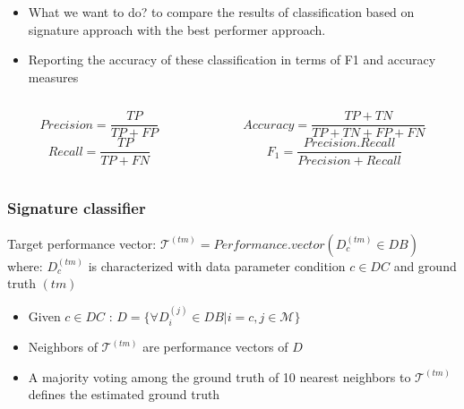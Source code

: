 \documentclass{beamer}
\begin{document}
\begin{frame}
\begin{overprint}
\begin{itemize}
	\item What we want to do? to compare the results of classification based on signature approach with the best performer \small approach.
	\item Reporting the accuracy of these classification in terms of F1 and accuracy measures
\end{itemize}
\begin{columns}
\begin{column}{.4\textwidth}
\vspace{-0.5cm}
\begin{center}

\[Precision = \frac{TP}{TP+FP}\]
\[Recall = \frac{TP}{TP+FN}\]

\end{center}
\end{column}
\begin{column}{.6\textwidth}
\vspace{-1cm}
\begin{center}
\[Accuracy = \frac{TP+TN}{TP+TN+FP+FN}\]
\[F_1 = \frac{Precision.Recall}{Precision+Recall}\]
\end{center}
\end{column}
\end{columns}
\end{overprint}


\end{frame}

\begin{frame}\frametitle{Signature classifier}
\small{Target performance vector:} $\mathcal{T}^{(tm)} = Performance.vector(D_c^{(tm)} \in DB)$ where: $D_c^{(tm)}$ is characterized with data parameter condition $c \in DC$ and ground truth $(tm)$  \pause
\begin{itemize}
\item Given $c \in DC$  : $D = \{\forall D_i^{(j)} \in DB | i = c , j \in \mathcal{M} \}$ \pause
\item Neighbors of $\mathcal{T}^{(tm)}$ are performance vectors of $D$ \pause
\item A majority voting among the ground truth of 10 nearest neighbors to $\mathcal{T}^{(tm)}$ defines the estimated ground truth 
\end{itemize}
\end{frame}
\end{document}
